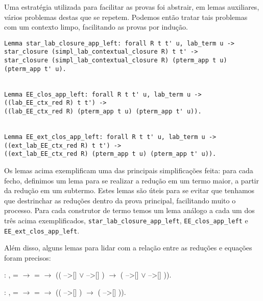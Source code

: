 Uma estratégia utilizada para facilitar as provas foi abstrair, em lemas
auxiliares, vários problemas destas que se repetem. Podemos então tratar tais
problemas com um contexto limpo, facilitando as provas por indução. 

\begin{lstlisting}[basicstyle=\small]
Lemma star_lab_closure_app_left: forall R t t' u, lab_term u -> 
star_closure (simpl_lab_contextual_closure R) t t' -> 
star_closure (simpl_lab_contextual_closure R) (pterm_app t u) (pterm_app t' u).


Lemma EE_clos_app_left: forall R t t' u, lab_term u -> 
((lab_EE_ctx_red R) t t') -> 
((lab_EE_ctx_red R) (pterm_app t u) (pterm_app t' u)).


Lemma EE_ext_clos_app_left: forall R t t' u, lab_term u -> 
((ext_lab_EE_ctx_red R) t t') -> 
((ext_lab_EE_ctx_red R) (pterm_app t u) (pterm_app t' u)).
\end{lstlisting}

Os lemas acima exemplificam uma das principais simplificações feita: para cada
fecho, definimos um lema para se realizar a redução em um termo maior, a partir
da redução em um subtermo. Estes lemas são úteis para se evitar que tenhamos que
destrinchar as reduções dentro da prova principal, facilitando muito o processo.
Para cada construtor de termo temos um lema análogo a cada um dos três acima
exemplificados, \texttt{star\_lab\_closure\_app\_left},
\texttt{EE\_clos\_app\_left} e \texttt{EE\_ext\_clos\_app\_left}.

Além disso, alguns lemas para lidar com a relação entre as reduções e equações
foram precisos:

\bigskip
{} : \coqdockw{\ensuremath{\forall}}
   , 
=  \ensuremath{\rightarrow} 
=  \ensuremath{\rightarrow} ((
-->[]  \ensuremath{\lor} 
-->[] ) \ensuremath{\rightarrow} (
-->[]  \ensuremath{\lor} 
-->[] )).\coqdoceol

\smallskip

 :
\coqdockw{\ensuremath{\forall}}   
,  = 
\ensuremath{\rightarrow}  = 
\ensuremath{\rightarrow} (( -->[] )
\ensuremath{\rightarrow} ( -->[]
)).\coqdoceol
\bigskip


